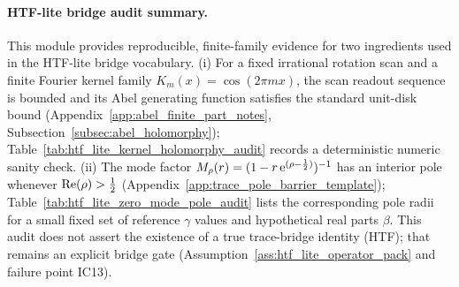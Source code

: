 \paragraph{HTF-lite bridge audit summary.} \AuditTag This module provides reproducible, finite-family evidence for two ingredients used in the HTF-lite bridge vocabulary. (i) For a fixed irrational rotation scan and a finite Fourier kernel family $K_m(x)=\cos(2\pi m x)$, the scan readout sequence is bounded and its Abel generating function satisfies the standard unit-disk bound (Appendix~\ref{app:abel_finite_part_notes}, Subsection~\ref{subsec:abel_holomorphy}); Table~\ref{tab:htf_lite_kernel_holomorphy_audit} records a deterministic numeric sanity check. (ii) The mode factor $M_\rho(r)=(1-r\,\mathrm{e}^{(\rho-\frac12)})^{-1}$ has an interior pole whenever $\operatorname{Re}(\rho)>\tfrac12$ (Appendix~\ref{app:trace_pole_barrier_template}); Table~\ref{tab:htf_lite_zero_mode_pole_audit} lists the corresponding pole radii for a small fixed set of reference $\gamma$ values and hypothetical real parts $\beta$. This audit does not assert the existence of a true trace-bridge identity (HTF); that remains an explicit bridge gate (Assumption~\ref{ass:htf_lite_operator_pack} and failure point IC13).